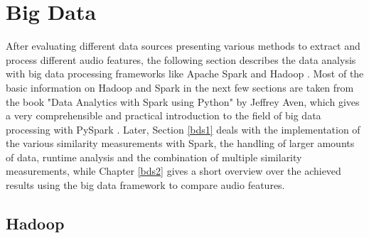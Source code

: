 
\section{Big Data}\label{bdf}

After evaluating different data sources presenting various methods to extract and process different audio features, the following section describes the data analysis with big data processing frameworks like Apache Spark \cite{spark} and Hadoop \cite{hadoop}. Most of the basic information on Hadoop and Spark in the next few sections are taken from the book "Data Analytics with Spark using Python" by Jeffrey Aven, which gives a very comprehensible and practical introduction to the field of big data processing with PySpark \cite{sparkbook1}. Later, Section \ref{bds1} deals with the implementation of the various similarity measurements with Spark, the handling of larger amounts of data, runtime analysis and the combination of multiple similarity measurements, while Chapter \ref{bds2} gives a short overview over the achieved results using the big data framework to compare audio features. 

\subsection{Hadoop}

